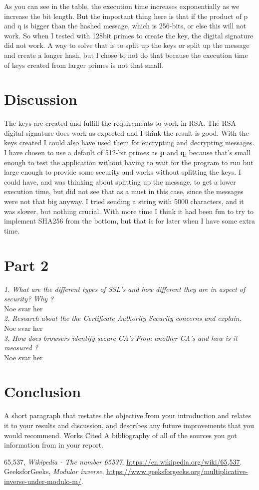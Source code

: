 \documentclass[12pt, letterpaper]{article}
\begin{document}
As you can see in the table, the execution time increases exponentially as we increase the bit length. But the important thing here is that if the product of p and q is bigger than the hashed message, which is 256-bits, or else this will not work. So when I tested with 128bit primes to create the key, the digital signature did not work. A way to solve that is to split up the keys or split up the message and create a longer hash, but I chose to not do that because the execution time of keys created from larger primes is not that small.

\section*{Discussion}
The keys are created and fulfill the requirements to work in RSA. The RSA digital signature does work as expected and I think the result is good. With the keys created I could also have used them for encrypting and decrypting messages. I have chosen to use a default of 512-bit primes as \textbf{p} and \textbf{q}, because that's small enough to test the application without having to wait for the program to run but large enough to provide some security and works without splitting the keys. 
I could have, and was thinking about splitting up the message, to get a lower execution time, but did not see that as a must in this case, since the messages were not that big anyway. I tried sending a string with 5000 characters, and it was slower, but nothing crucial. With more time I think it had been fun to try to implement SHA256 from the bottom, but that is for later when I have some extra time. 

\section*{Part 2}
\textit{1. What are the different types of SSL's and how different they are in aspect of security? Why ?}\\
Noe svar her
\\
\textit{2. Research about the the Certificate Authority Security concerns and explain.}\\
Noe svar her
\\
\textit{3. How does browsers identify secure CA's From another CA's and how is it measured ?}\\
Noe svar her

\section*{Conclusion}
A short paragraph that restates the objective from your introduction and relates it to your results and discussion, and
describes any future improvements that you would recommend. Works Cited A bibliography of all of the sources
you got information from in your report. 


\begin{thebibliography}{10} 
 65,537,  \emph{Wikipedia - The number 65537},
\url{https://en.wikipedia.org/wiki/65,537}.
 GeeksforGeeks,  \emph{Modular inverse},
\url{https://www.geeksforgeeks.org/multiplicative-inverse-under-modulo-m/}.
\end{thebibliography}
\end{document}
